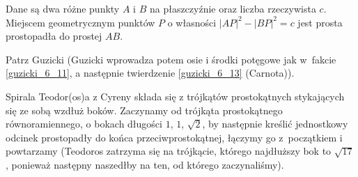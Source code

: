 \begin{proposition}
    Dane są dwa różne punkty $A$ i $B$ na płaszczyźnie oraz liczba rzeczywista $c$.
    Miejscem geometrycznym punktów $P$ o własności $|AP|^2 - |BP|^2 = c$ jest prosta prostopadła do prostej $AB$.
\end{proposition}

Patrz Guzicki \cite[s. 170-173]{guzicki_2021} (Guzicki wprowadza potem osie i środki potęgowe jak w~fakcie \ref{guzicki_6_11}, a następnie twierdzenie \ref{guzicki_6_13} (Carnota)).

Spirala Teodor(os)a z Cyreny składa się z trójkątów prostokątnych stykających się ze sobą wzdłuż boków.
%
%
Zaczynamy od trójkąta prostokątnego równoramiennego, o bokach długości $1$, $1$, $\sqrt{2}$, by następnie kreślić jednostkowy odcinek prostopadły do końca przeciwprostokątnej, łączymy go z~początkiem i powtarzamy (Teodoros zatrzyma się na trójkącie, którego najdłuższy bok to $\sqrt{17}$, ponieważ następny naszedłby na ten, od którego zaczynaliśmy).
